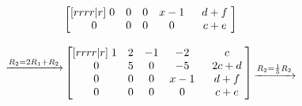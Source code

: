 \documentclass[a4paper]{article}
\begin{document}
\begin{enumerate}[label=\textbf{\arabic*.}]
\begin{enumerate}
$$\begin{bmatrix}[rrrr|r]
					\hspace{1mm} 0 & 0 & 0 & x - 1 \hspace{1mm} & \hspace{1mm} d + f \hspace{1mm}\\
					\hspace{1mm} 0 & 0 & 0 & 0 \hspace{1mm} & \hspace{1mm} c + e \hspace{1mm}\\
				\end{bmatrix}
				$$

				$$
				\begin{matrix}
					~\\
					\xrightarrow{R_2 = 2R_1 + R_2} \\
					~\\
					~\\
				\end{matrix}
				\begin{bmatrix}[rrrr|r]
					\hspace{1mm} 1 & 2 & -1 & -2 \hspace{1mm} & \hspace{1mm} c \hspace{1mm}\\
					\hspace{1mm} 0 & 5 & 0 & -5 \hspace{1mm} & \hspace{1mm} 2c + d \hspace{1mm}\\
					\hspace{1mm} 0 & 0 & 0 & x - 1 \hspace{1mm} & \hspace{1mm} d + f \hspace{1mm}\\
					\hspace{1mm} 0 & 0 & 0 & 0 \hspace{1mm} & \hspace{1mm} c + e \hspace{1mm}\\
				\end{bmatrix}
				\begin{matrix}
					~\\
					\xrightarrow{R_2 = \frac{1}{5}R_2} \\
					~\\

\end{matrix}$$
\end{enumerate}
\end{enumerate}
\end{document}
